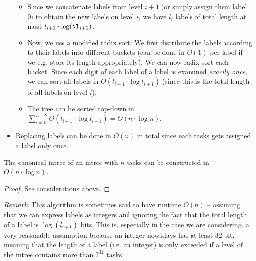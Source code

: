 \begin{itemize}
\begin{itemize}
  \item Since we concatenate labels from level $i+1$ (or simply assign them label 0) to obtain the new labels on level $i$, we have $l_i$ labels of total length at most $l_{i+1}\cdot \log(\l_{i+1})$.
  \item Now, we use a modified radix sort: We first distribute the labels according to their labels into different buckets (can be done in $O(1)$ per label if we e.g. store its length appropriately). 
    We can now radix-sort each bucket. Since each digit of each label of a label is examined \emph{exactly once}, we can sort all labels in $O(l_{i+1}\cdot \log l_{i+1})$ (since this is the total length of all labels on level $i$).
  \item The tree can be sorted top-down in $\sum_{i=0}^{L-2}O(l_{i+1} \cdot \log l_{i+1})=O(n\cdot \log n)$.
  \end{itemize}
\item Replacing labels can be done in $O(n)$ in total since each tasks gets assigned a label only once.
\end{itemize}

\begin{theorem}
  The canonical intree of an intree with $n$ tasks can be constructed in $O(n\cdot \log n)$.
\end{theorem}

\begin{proof}
  See considerations above.
\end{proof}

\emph{Remark:} This algorithm is sometimes said to have runtime $O(n)$ -- assuming that we can express labels as integers and ignoring the fact that the total length of a label is $\log(l_{i+1})$ bits. This is, especially in the case we are considering, a very reasonable assumption because an integer nowadays has at least 32 bit, meaning that the length of a label (i.e. an integer) is only exceeded if a level of the intree contains more than $2^{32}$ tasks.

